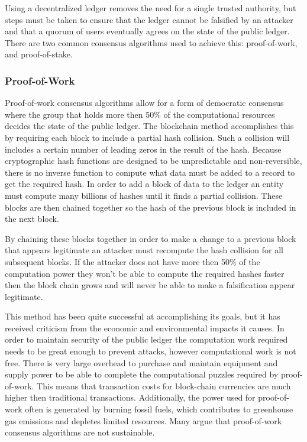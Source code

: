 \documentclass[runningheads]{llncs}
\begin{document}
Using a decentralized ledger removes the need for a single trusted authority, but steps must be taken to ensure that the ledger cannot be falsified by an attacker and that a quorum of users eventually agrees on the state of the public ledger. There are two common consensus algorithms used to achieve this: proof-of-work, and proof-of-stake.

\subsubsection{Proof-of-Work}
Proof-of-work consensus algorithms allow for a form of democratic consensus where the group that holds more then 50\% of the computational resources decides the state of the public ledger. The blockchain method accomplishes this by requiring each block to include a partial hash collision. Such a collision will includes a certain number of leading zeros in the result of the hash. Because cryptographic hash functions are designed to be unpredictable and non-reversible, there is no inverse function to compute what data must be added to a record to get the required hash. In order to add a block of data to the ledger an entity must compute many billions of hashes until it finds a partial collision. These blocks are then chained together so the hash of the previous block is included in the next block. 

By chaining these blocks together in order to make a change to a previous block that appears legitimate an attacker must recompute the hash collision for all subsequent blocks. If the attacker does not have more then 50\% of the computation power they won't be able to compute the required hashes faster then the block chain grows and will never be able to make a falsification appear legitimate.

This method has been quite successful at accomplishing its goals, but it has received criticism from the economic and environmental impacts it causes. In order to maintain security of the public ledger the computation work required needs to be great enough to prevent attacks, however computational work is not free. There is very large overhead to purchase and maintain equipment and supply power to be able to complete the computational puzzles required by proof-of-work. This means that transaction costs for block-chain currencies are much higher then traditional transactions. Additionally, the power used for proof-of-work often is generated by burning fossil fuels, which contributes to greenhouse gas emissions and depletes limited resources. Many argue that proof-of-work consensus algorithms are not sustainable. 
\end{document}
